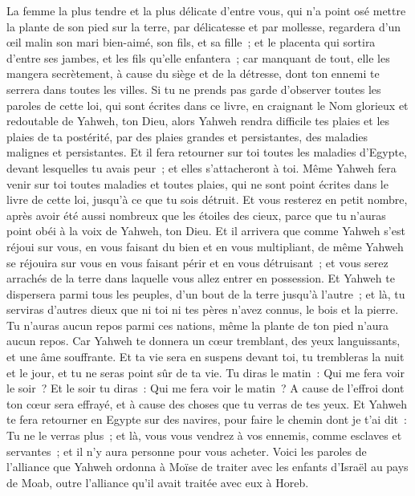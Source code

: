 \begin{multicols}{2}
La femme la plus tendre et la plus délicate d'entre vous, qui n'a point osé mettre la plante de son pied sur la terre, par délicatesse et par mollesse, regardera d'un œil malin son mari bien-aimé, son fils, et sa fille~;
et le placenta qui sortira d'entre ses jambes, et les fils qu'elle enfantera~; car manquant de tout, elle les mangera secrètement, à cause du siège et de la détresse, dont ton ennemi te serrera dans toutes les villes.
Si tu ne prends pas garde d'observer toutes les paroles de cette loi, qui sont écrites dans ce livre, en craignant le Nom glorieux et redoutable de Yahweh, ton Dieu,
alors Yahweh rendra difficile tes plaies et les plaies de ta postérité, par des plaies grandes et persistantes, des maladies malignes et persistantes.
Et il fera retourner sur toi toutes les maladies d'Egypte, devant lesquelles tu avais peur~; et elles s'attacheront à toi.
Même Yahweh fera venir sur toi toutes maladies et toutes plaies, qui ne sont point écrites dans le livre de cette loi, jusqu'à ce que tu sois détruit.
Et vous resterez en petit nombre, après avoir été aussi nombreux que les étoiles des cieux, parce que tu n'auras point obéi à la voix de Yahweh, ton Dieu.
Et il arrivera que comme Yahweh s'est réjoui sur vous, en vous faisant du bien et en vous multipliant, de même Yahweh se réjouira sur vous en vous faisant périr et en vous détruisant~; et vous serez arrachés de la terre dans laquelle vous allez entrer en possession.
Et Yahweh te dispersera parmi tous les peuples, d'un bout de la terre jusqu'à l'autre~; et là, tu serviras d'autres dieux que ni toi ni tes pères n'avez connus, le bois et la pierre.
Tu n'auras aucun repos parmi ces nations, même la plante de ton pied n'aura aucun repos. Car Yahweh te donnera un cœur tremblant, des yeux languissants, et une âme souffrante.
Et ta vie sera en suspens devant toi, tu trembleras la nuit et le jour, et tu ne seras point sûr de ta vie.
Tu diras le matin~: Qui me fera voir le soir~? Et le soir tu diras~: Qui me fera voir le matin~? A cause de l'effroi dont ton cœur sera effrayé, et à cause des choses que tu verras de tes yeux.
Et Yahweh te fera retourner en Egypte sur des navires, pour faire le chemin dont je t'ai dit~: Tu ne le verras plus~; et là, vous vous vendrez à vos ennemis, comme esclaves et servantes~; et il n'y aura personne pour vous acheter.
\VerseOne{}Voici les paroles de l'alliance que Yahweh ordonna à Moïse de traiter avec les enfants d'Israël au pays de Moab, outre l'alliance qu'il avait traitée avec eux à Horeb.

\end{multicols}
